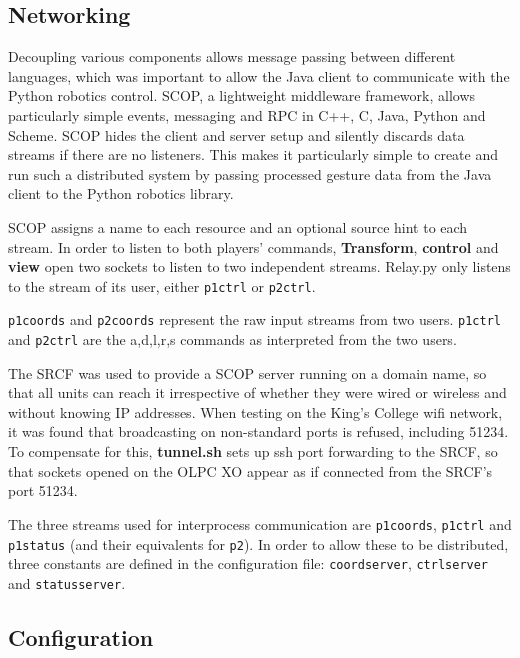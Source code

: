 \documentclass[12pt,a4,notitlepage]{report}
\renewcommand{\_}{\texttt{\symbol{95}}}
\newcommand{\<}{\texttt{\symbol{60}}}
\renewcommand{\>}{\texttt{\symbol{62}}}
\newcommand{\class}[1]{\textbf{#1}}
\newcommand{\scopendpoint}[1]{\texttt{#1}}
\newcommand{\variable}[1]{\texttt{#1}}
\begin{document}
\subsection{Networking}

Decoupling various components allows message passing between different languages, which was important to allow the Java client to communicate with the Python robotics control. SCOP, a lightweight middleware framework, allows particularly simple events, messaging and RPC in C++, C, Java, Python and Scheme. SCOP hides the client and server setup and silently discards data streams if there are no listeners. This makes it particularly simple to create and run such a distributed system by passing processed gesture data from the Java client to the Python robotics library.

SCOP assigns a name to each resource and an optional source hint to each stream. In order to listen to both players' commands, \class{Transform}, \class{control} and \class{view} open two sockets to listen to two independent streams. Relay.py only listens to the stream of its user, either \scopendpoint{p1ctrl} or \scopendpoint{p2ctrl}.

\scopendpoint{p1coords} and \scopendpoint{p2coords} represent the raw input streams from two users.
\scopendpoint{p1ctrl} and \scopendpoint{p2ctrl} are the {a,d,l,r,s} commands as interpreted from the two users.

The SRCF was used to provide a SCOP server running on a domain name, so that all units can reach it irrespective of whether they were wired or wireless and without knowing IP addresses. When testing on the King's College wifi network, it was found that broadcasting on non-standard ports is refused, including 51234. To compensate for this, \class{tunnel.sh} sets up ssh port forwarding to the SRCF, so that sockets opened on the OLPC XO appear as if connected from the SRCF's port 51234.

The three streams used for interprocess communication are \scopendpoint{p1coords}, \scopendpoint{p1ctrl} and \scopendpoint{p1status} (and their equivalents for \scopendpoint{p2}). In order to allow these to be distributed, three constants are defined in the configuration file: \variable{coordserver}, \variable{ctrlserver} and \variable{statusserver}. 

\subsection{Configuration}
\end{document}
